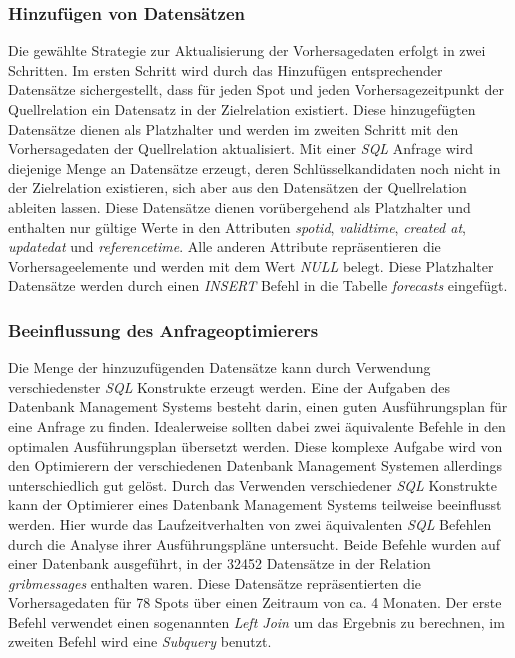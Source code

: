 \subsubsection{Hinzufügen von Datensätzen}
Die gewählte Strategie zur Aktualisierung der Vorhersagedaten erfolgt
in zwei Schritten. Im ersten Schritt wird durch das Hinzufügen
entsprechender Datensätze sichergestellt, dass für jeden Spot und
jeden Vorhersagezeitpunkt der Quellrelation ein Datensatz in der
Zielrelation existiert. Diese hinzugefügten Datensätze dienen als
Platzhalter und werden im zweiten Schritt mit den Vorhersagedaten der
Quellrelation aktualisiert. Mit einer \textit{SQL} Anfrage wird
diejenige Menge an Datensätze erzeugt, deren Schlüsselkandidaten noch
nicht in der Zielrelation existieren, sich aber aus den Datensätzen
der Quellrelation ableiten lassen. Diese Datensätze dienen
vorübergehend als Platzhalter und enthalten nur gültige Werte in den
Attributen \textit{spot\textunderscore id},
\textit{valid\textunderscore time}, \textit{created\textunderscore
  at}, \textit{updated\textunderscore at} und
\textit{reference\textunderscore time}. Alle anderen Attribute
repräsentieren die Vorhersageelemente und werden mit dem Wert
\textit{NULL} belegt. Diese Platzhalter Datensätze werden durch einen
\textit{INSERT} Befehl in die Tabelle \textit{forecasts} eingefügt.

\subsubsection{Beeinflussung des Anfrageoptimierers}
Die Menge der hinzuzufügenden Datensätze kann durch Verwendung
verschiedenster \textit{SQL} Konstrukte erzeugt werden. Eine der
Aufgaben des Datenbank Management Systems besteht darin, einen guten
Ausführungsplan für eine Anfrage zu finden. Idealerweise sollten dabei
zwei äquivalente Befehle in den optimalen Ausführungsplan übersetzt
werden. Diese komplexe Aufgabe wird von den Optimierern der
verschiedenen Datenbank Management Systemen allerdings unterschiedlich
gut gelöst. Durch das Verwenden verschiedener \textit{SQL} Konstrukte
kann der Optimierer eines Datenbank Management Systems teilweise
beeinflusst werden. Hier wurde das Laufzeitverhalten von zwei
äquivalenten \textit{SQL} Befehlen durch die Analyse ihrer
Ausführungspläne untersucht. Beide Befehle wurden auf einer Datenbank
ausgeführt, in der 32452 Datensätze in der Relation
\textit{grib\textunderscore messages} enthalten waren. Diese
Datensätze repräsentierten die Vorhersagedaten für 78 Spots über einen
Zeitraum von ca. 4 Monaten. Der erste Befehl verwendet einen
sogenannten \textit{Left Join} um das Ergebnis zu berechnen, im
zweiten Befehl wird eine \textit{Subquery} benutzt.

